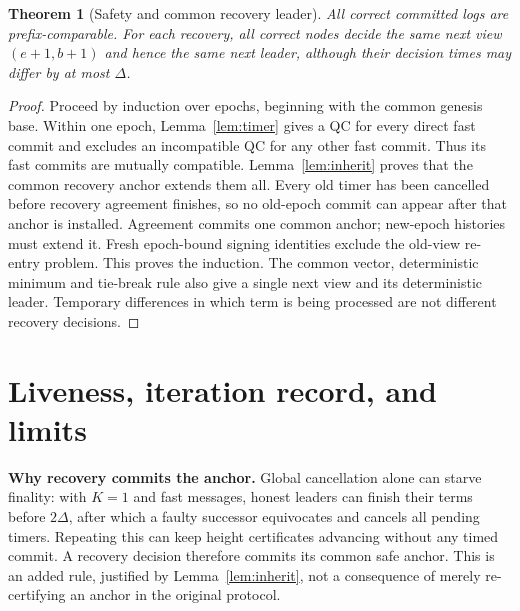 \documentclass[10pt,a4paper]{article}
\newtheorem{theorem}{Theorem}
\begin{document}
\begin{theorem}[Safety and common recovery leader]
All correct committed logs are prefix-comparable. For each recovery,
all correct nodes decide the same next view $(e+1,b+1)$ and hence the same
next leader, although their decision times may differ by at most $\Delta$.
\end{theorem}
\begin{proof}
Proceed by induction over epochs, beginning with the common genesis base.
Within one epoch, Lemma~\ref{lem:timer} gives a QC for every direct fast
commit and excludes an incompatible QC for any other fast commit. Thus its
fast commits are mutually compatible. Lemma~\ref{lem:inherit} proves that
the common recovery anchor extends them all. Every old timer has been
cancelled before recovery agreement finishes, so no old-epoch commit can
appear after that anchor is installed. Agreement commits one common anchor;
new-epoch histories must extend it. Fresh epoch-bound signing identities
exclude the old-view re-entry problem. This proves the induction.
The common vector, deterministic minimum and tie-break rule also give a
single next view and its deterministic leader. Temporary differences in
which term is being processed are not different recovery decisions.
\end{proof}

\clearpage
\section*{Liveness, iteration record, and limits}
\textbf{Why recovery commits the anchor.} Global cancellation alone can
starve finality: with $K=1$ and fast messages, honest leaders can finish their
terms before $2\Delta$, after which a faulty successor equivocates and cancels
all pending timers. Repeating this can keep height certificates advancing
without any timed commit. A recovery decision therefore commits its common
safe anchor. This is an added rule, justified by Lemma~\ref{lem:inherit}, not
a consequence of merely re-certifying an anchor in the original protocol.
\end{document}
